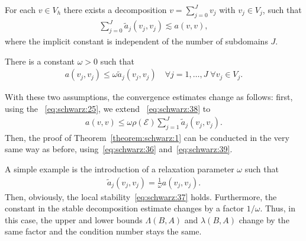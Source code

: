 \begin{assumption}
  \label{assumption:schwarz:stable-decomposition-2}
    For each $v\in V_h$ there exists a decomposition $v=\sum_{j=0}^J
  v_j$ with $v_j\in V_j$, such that
  \begin{gather}
    \label{eq:schwarz:36}
    \sum_{j=0}^J \widetilde a_j(v_j, v_j)
    \lesssim a(v,v),
  \end{gather}
  where the implicit constant is independent of the number of
  subdomains $J$.
\end{assumption}

\begin{assumption}
  \label{assumption:schwarz:local-stability}
  There is a constant $\omega > 0$ such that
  \begin{gather}
    \label{eq:schwarz:37}
    a(v_j, v_j) \le \omega \widetilde a_j(v_j, v_j)
    \quad\forall j=1,\dots,J \; \forall v_j\in V_j.
  \end{gather}
\end{assumption}

\begin{remark}
  With these two assumptions, the convergence estimates change as
  follows: first, using the ~\eqref{eq:schwarz:25}, we extend ~\eqref{eq:schwarz:38}
  to
  \begin{gather}
    \label{eq:schwarz:39}
    a(v,v) \le \omega \rho(\mathcal E) \sum_{j=1}^J \widetilde a_j(v_j, v_j).
  \end{gather}
  Then, the proof of Theorem~\ref{theorem:schwarz:1} can be conducted
  in the very same way as before, using~\eqref{eq:schwarz:36}
  and~\eqref{eq:schwarz:39}.
\end{remark}

\begin{example}
  A simple example is the introduction of a relaxation parameter
  $\omega$ such that
  \begin{gather*}
    \widetilde a_j(v_j, v_j) = \frac1\omega a(v_j, v_j).
  \end{gather*}
  Then, obviously, the local stability~\eqref{eq:schwarz:37}
  holds. Furthermore, the constant in the stable decomposition
  estimate changes by a factor $1/\omega$. Thus, in this case, the
  upper and lower bounds $\Lambda(B,A)$ and $\lambda(B,A)$ change by
  the same factor and the condition number stays the same.
\end{example}

